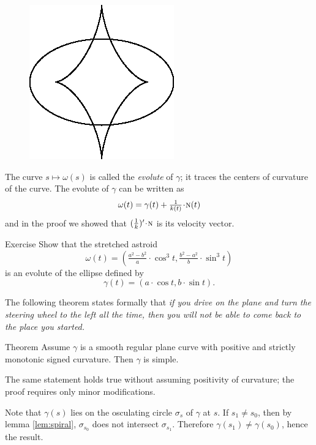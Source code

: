 {

\begin{figure}
\vskip-4mm
\centering
\includegraphics{asy/ellipse-astroid}
\vskip-0mm
\end{figure}

The curve $s\mapsto \omega(s)$ is called the \emph{evolute} of $\gamma$; 
it traces the centers of curvature of the curve. 
The evolute of $\gamma$ can be written as 
\[\omega(t)=\gamma(t)+\tfrac1{\skur(t)}\cdot \norm(t)\] and  
in the proof we showed that $(\tfrac1{\skur})'\cdot\norm$ is its velocity vector.


\begin{thm}{Exercise}\label{ex:evolute-of-ellipse}
Show that the stretched astroid 
\[\omega(t)=(\tfrac{a^2-b^2}{a}\cdot \cos^3 t,  \tfrac{b^2-a^2}{b}\cdot\sin^3 t)\]
is an evolute of the ellipse defined by
\[\gamma(t)= (a\cdot \cos t, b\cdot\sin t).\]
\end{thm}

The following theorem states formally that 
\emph{if you drive on the plane and turn the steering wheel to the left all the time,
then you will not be able to come back to the place you started.}

}

\begin{thm}{Theorem}\label{thm:spiral}
Assume $\gamma$ is a smooth regular plane curve with positive and strictly monotonic signed curvature. 
Then $\gamma$ is simple.
\end{thm}

The same statement holds true without assuming positivity of curvature; the proof requires only minor modifications.

Note that $\gamma(s)$ lies on the osculating circle $\sigma_s$ of $\gamma$ at $s$.
If $s_1\ne s_0$, then by lemma \ref{lem:spiral}, $\sigma_{s_0}$ does not intersect $\sigma_{s_1}$.
Therefore $\gamma(s_1)\ne \gamma(s_0)$,
hence the result.\qeds

